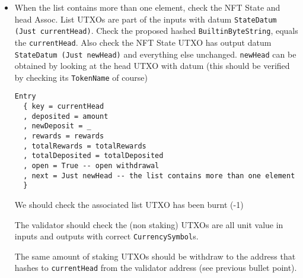 \documentclass[10pt, a4paper]{article}
\theoremstyle{definition}
\begin{document}
\begin{enumerate}
{\begin{itemize}
{\begin{itemize}
\item{If \textbf{open} during \texttt{upp'userLength}, withdraw \texttt{amount} plus \\ $\texttt{withdrawRewards} = \texttt{rewards} + f$ with $f := \frac{\texttt{amount} - \texttt{newDeposit} + \texttt{rewards}}{\texttt{totalDeposited}} * \texttt{totalRewards}$ (rewards for the last bonding cycle).}
\item{If \textbf{open} during \texttt{upp'bondingLength}, withdraw \texttt{amount} plus \\ $\texttt{withdrawRewards} = \texttt{rewards} + \frac{f}{(1 + \texttt{upp'interest})^k}$ for $1 \le k \le \texttt{upp'increments}$
 with $f := \frac{\texttt{amount} - \st{\texttt{newDeposit}} + \texttt{rewards}}{\texttt{totalDeposited}} * \texttt{totalRewards}$ (rewards for current incomplete bonding window).}
\end{itemize}

This all assumes the admin doesn't automatically distribute rewards upon closure. This is all verifiable on chain.
}

\item{
When the list contains more than one element, check the NFT State and head Assoc. List UTXOs are part of the inputs with datum \texttt{StateDatum (Just currentHead)}. Check the proposed hashed \texttt{BuiltinByteString}, equals the \texttt{currentHead}. Also check the NFT State UTXO has output datum \texttt{StateDatum (Just newHead)} and everything else unchanged. \texttt{newHead} can be obtained by looking at the head UTXO with datum (this should be verified by checking its \texttt{TokenName} of course)
\begin{verbatim}
Entry
  { key = currentHead
  , deposited = amount
  , newDeposit = _
  , rewards = rewards
  , totalRewards = totalRewards 
  , totalDeposited = totalDeposited
  , open = True -- open withdrawal
  , next = Just newHead -- the list contains more than one element
  }
\end{verbatim}


 We should check the associated list UTXO has been burnt (-1)

The validator should check the (non staking) UTXOs are all unit value in inputs and outputs with correct \texttt{CurrencySymbol}s.

The same amount of staking UTXOs should be withdraw to the address that hashes to \texttt{currentHead} from the validator address (see previous bullet point).
}

\end{itemize} 

}
\end{enumerate}
\end{document}
